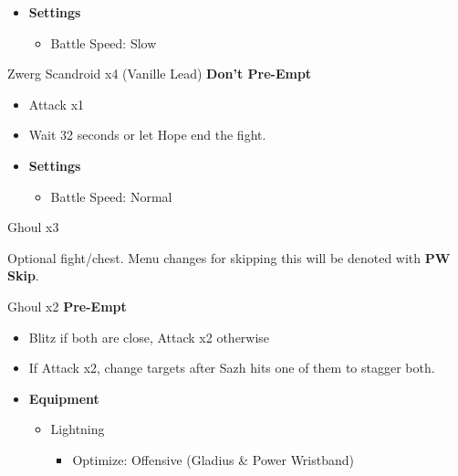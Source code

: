 \begin{multicols}{2}
\begin{menu}
\begin{itemize}
    \item \textbf{Settings}
    \begin{itemize}
        \item Battle Speed: Slow
    \end{itemize}
\end{itemize}
\end{menu}

\begin{battle}{Zwerg Scandroid x4 (Vanille Lead) \textbf{Don't Pre-Empt}}
\begin{itemize}
    \item Attack x1
    \item Wait 32 seconds or let Hope end the fight.
\end{itemize}
\end{battle}

\begin{menu}
\begin{itemize}
    \item \textbf{Settings}
    \begin{itemize}
        \item Battle Speed: Normal
    \end{itemize}
\end{itemize}
\end{menu}

\begin{battle}{Ghoul x3}
\end{battle}

Optional fight/chest. Menu changes for skipping this will be denoted with {\bf PW Skip}.
\begin{battle}{Ghoul x2 \textbf{Pre-Empt}}
\begin{itemize}
    \item Blitz if both are close, Attack x2 otherwise
    \item If Attack x2, change targets after Sazh hits one of them to stagger both.
\end{itemize}
\end{battle}


\begin{menu}
\begin{itemize}
    \item \textbf{Equipment}
    \begin{itemize}
        \item Lightning
        \begin{itemize}
            \item Optimize: Offensive (Gladius \& Power Wristband)
        \end{itemize}
    \end{itemize}
\end{itemize}
\end{menu}


\end{multicols}
